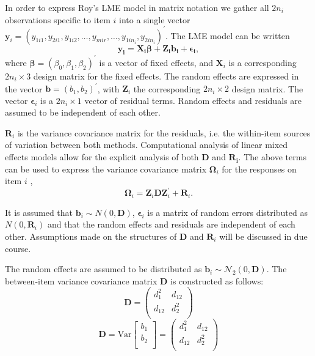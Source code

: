 \documentclass[12pt, a4paper]{report}
\theoremstyle{plain}
\theoremstyle{definition}
\theoremstyle{remark}
\begin{document}
	
	
	
	
	
	
	In order to express Roy's LME model in matrix notation we gather all $2n_i$ observations specific to item $i$ into a single vector  $\boldsymbol{y}_{i} = (y_{1i1},y_{2i1},y_{1i2},\ldots,y_{mir},\ldots,y_{1in_{i}},y_{2in_{i}})^\prime.$ The LME model can be written
	\[
	\boldsymbol{y_{i}} = \boldsymbol{X_{i}\beta} + \boldsymbol{Z_{i}b_{i}} + \boldsymbol{\epsilon_{i}},
	\]
	where $\boldsymbol{\beta}=(\beta_0,\beta_1,\beta_2)^\prime$ is a vector of fixed effects, and $\boldsymbol{X}_i$ is a corresponding $2n_i\times 3$ design matrix for the fixed effects. The random effects are expressed in the vector $\boldsymbol{b}=(b_1,b_2)^\prime$, with $\boldsymbol{Z}_i$ the corresponding $2n_i\times 2$ design matrix. The vector $\boldsymbol{\epsilon}_i$ is a $2n_i\times 1$ vector of residual terms. Random effects and residuals are assumed to be independent of each other.
	
	$\boldsymbol{R}_{i}$ is the variance covariance matrix for the residuals, i.e. the within-item sources of variation between both methods. Computational analysis of linear mixed effects models allow for the explicit analysis of both $\boldsymbol{D}$ and $\boldsymbol{R_i}$.
	The above terms can be used to express the  variance covariance matrix $\boldsymbol{\Omega}_i$ for the responses on item $i$ ,
	\[
	\boldsymbol{\Omega}_i = \boldsymbol{Z}_i \boldsymbol{D} \boldsymbol{Z}_i^{\prime} + \boldsymbol{R}_i.
	\]
	
	It is assumed that $\boldsymbol{b}_i \sim N(0,\boldsymbol{D})$, $\boldsymbol{\epsilon}_i$ is a matrix of random errors distributed as $N(0,\boldsymbol{R}_i)$ and that the random effects and residuals are independent of each other. Assumptions made on the structures of $\boldsymbol{D}$ and $\boldsymbol{R}_i$ will be discussed in due course.
	
	The random effects are assumed to be distributed as $\boldsymbol{b}_i \sim \mathcal{N}_2(0,\boldsymbol{D})$. The between-item variance covariance matrix $\boldsymbol{D}$ is constructed as follows:
	\[ \boldsymbol{D} =\left(
	\begin{array}{cc}
	d^2_1  & d_{12} \\
	d_{12} & d^2_2 \\
	\end{array}
	\right) \]
	\[ \boldsymbol{D} = \mbox{Var}  \left[
	\begin{array}{c}
	b_1   \\
	b_2  \\
	\end{array}
	\right] =  \left(
	\begin{array}{cc}
	d^2_1  & d_{12} \\
	d_{12} & d^2_2 \\
	\end{array}
	\right) \]
	
\end{document}
